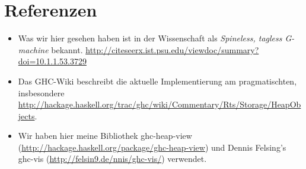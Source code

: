 \documentclass[11pt,DIV=12,parskip=half,headings=normal,abstract]{scrartcl}
\begin{document}
\section{Referenzen}

\begin{itemize}
\item Was wir hier gesehen haben ist in der Wissenschaft als \emph{Spineless, tagless G-machine} bekannt. \url{http://citeseerx.ist.psu.edu/viewdoc/summary?doi=10.1.1.53.3729}
\item Das GHC-Wiki beschreibt die aktuelle Implementierung am pragmatischten, insbesondere \url{http://hackage.haskell.org/trac/ghc/wiki/Commentary/Rts/Storage/HeapObjects}.
\item Wir haben hier meine Bibliothek ghc-heap-view (\url{http://hackage.haskell.org/package/ghc-heap-view}) und Dennis Felsing’s ghc-vis (\url{http://felsin9.de/nnis/ghc-vis/}) verwendet.
\end{itemize}
\end{document}
